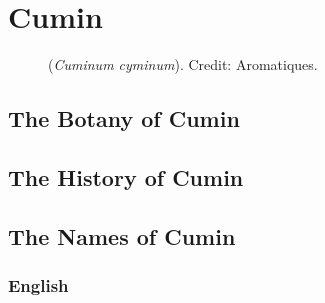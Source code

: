 \section{Cumin}
\label{sec:cumin}



\begin{figure}[!ht]
	\vspace{-2ex}
	\centering
	\hfill
	\caption[Cumin]{ (\textit{Cuminum cyminum}). Credit: Aromatiques.}
	\label{fig:cumin_imgs}
\end{figure}

\subsection{The Botany of Cumin}

\subsection{The History of Cumin}

\subsection{The Names of Cumin}

\subsubsection{English}

